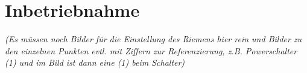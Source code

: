 %
%

\chapter{Inbetriebnahme}
	\textit{(Es müssen noch Bilder für die Einstellung des Riemens hier rein und Bilder zu den einzelnen Punkten evtl. mit Ziffern zur Referenzierung, z.B. Powerschalter (1) und im Bild ist dann eine (1) beim Schalter)}\\
